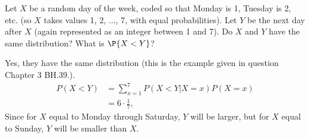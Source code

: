 
\setcounter{theorem}{17}
\begin{exercise}[BH.3.42]
  Let $X$ be a random day of the week, coded so that Monday is 1, Tuesday is 2, etc. (so $X$ takes values 1, 2, ..., 7, with equal probabilities). Let $Y$ be the next day after $X$ (again represented as an integer between 1 and 7). Do $X$ and $Y$ have the same distribution? What is $\P{X < Y}$?
\begin{solution}
	Yes, they have the same distribution (this is the example given in question Chapter 3 BH.39.). 
    \begin{align*}
    	P(X<Y) &= \sum_{x = 1}^{7}P(X<Y|X=x)P(X=x)\\
    	& = 6\cdot\frac{1}{7},
    \end{align*}
    Since for $X$ equal to Monday through Saturday, $Y$ will be larger, but for $X$ equal to Sunday, $Y$ will be smaller than $X$.
\end{solution}
\end{exercise}


